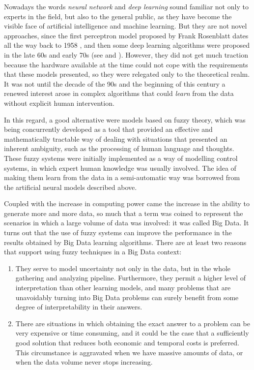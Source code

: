 %
%
%

Nowadays the words \textit{neural network} and \textit{deep learning} sound familiar not only to experts in the field, but also to the general public, as they have become the visible face of artificial intelligence and machine learning. But they are not novel approaches, since the first perceptron model proposed by Frank Rosenblatt dates all the way back to 1958 \cite{rosenblatt1958perceptron}, and then some deep learning algorithms were proposed in the late 60s and early 70s (see \cite{ivakhnenko1967cybernetics} and \cite{ivakhnenko1971polynomial}). However, they did not get much traction because the hardware available at the time could not cope with the requirements that these models presented, so they were relegated only to the theoretical realm. It was not until the decade of the 90s and the beginning of this century a renewed interest arose in complex algorithms that could \textit{learn} from the data without explicit human intervention.

In this regard, a good alternative were models based on fuzzy theory, which was being concurrently developed as a tool that provided an effective and mathematically tractable way of dealing with situations that presented an inherent ambiguity, such as the processing of human language and thoughts. These fuzzy systems were initially implemented as a way of modelling control systems, in which expert human knowledge was usually involved. The idea of making them learn from the data in a semi-automatic way was borrowed from the artificial neural models described above.

Coupled with the increase in computing power came the increase in the ability to generate more and more data, so much that a term was coined to represent the scenarios in which a large volume of data was involved: it was called Big Data. It turns out that the use of fuzzy systems can improve the performance in the results obtained by Big Data learning algorithms. There are at least two reasons that support using fuzzy techniques in a Big Data context:

\begin{enumerate}[1.]
  \item They serve to model uncertainty not only in the data, but in the whole gathering and analyzing pipeline. Furthermore, they permit a higher level of interpretation than other learning models, and many problems that are unavoidably turning into Big Data problems can surely benefit from some degree of interpretability in their answers.
  \item There are situations in which obtaining the exact answer to a problem can be very expensive or time consuming, and it could be the case that a sufficiently good solution that reduces both economic and temporal costs is preferred. This circumstance is aggravated when we have massive amounts of data, or when the data volume never stops increasing.
\end{enumerate}

